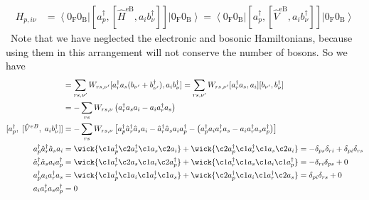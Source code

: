 \begin{align}
H_{p,i\nu} &= \left\langle 0_{\mathrm{F}} 0_{\mathrm{B}}\right|\left[a_p^\dag, \left[\hat{H}^{\mathrm{eB}}, a_i b_\nu^{\dagger} \right]\right]\left|0_{\mathrm{F}} 0_{\mathrm{B}}\right\rangle = \left\langle 0_{\mathrm{F}} 0_{\mathrm{B}}\right|\left[a_p^\dag, \left[\hat{V}^{\mathrm{eB}}, a_i b_\nu^{\dagger} \right]\right]\left|0_{\mathrm{F}} 0_{\mathrm{B}}\right\rangle
\end{align}\
Note that we have neglected the electronic and bosonic Hamiltonians, because using them in this arrangement will not conserve the number of bosons. So we have
\begin{align}
[ V^{eB},\; a_i b_\nu^\dagger ] &= \sum_{rs,\nu'} W_{rs, \nu'} [ a_r^{\dagger} a_s ( b_{\nu'} + b_{\nu'}^{\dagger} ), a_i b_\nu^\dagger ] = \sum_{rs,\nu'} W_{rs, \nu'} [ a_r^{\dagger} a_s, a_i ][ b_{\nu'}, b_\nu^\dagger ] \\
&= -\sum_{rs} W_{rs, \nu} \left( a_r^{\dagger} a_s a_i -  a_i a_r^{\dagger} a_s \right) \\
[a_p^\dagger,\;[\hat V^{eB},\;a_i b_\nu^\dagger]] &= -\sum_{rs} W_{rs, \nu} \left[ a_p^\dagger \hat{a}_r^{\dagger} \hat{a}_s a_i  - \hat{a}_r^{\dagger} \hat{a}_s a_i a_p^\dagger  - \left( a_p^\dag a_i a_r^{\dagger}a_s   - a_i a_r^{\dagger}a_s a_p^\dagger \right) \right] \\
a_p^\dagger \hat{a}_r^{\dagger} \hat{a}_s a_i  &= \wick{\c1 a_p^\dagger \c2 a_r^{\dagger} \c1 a_s \c2 a_i} + \wick{\c2 a_p^\dagger \c1 a_r^{\dagger} \c1 a_s \c2 a_i} = -\delta_{ps} \delta_{ri} + \delta_{pi} \delta_{rs} \\
\hat{a}_r^{\dagger} \hat{a}_s a_i a_p^\dagger &= \wick{\c1 a_r^{\dagger} \c2 a_s \c1 a_i \c2 a_p^\dagger} + \wick{\c1 a_r^{\dagger} \c1 a_s \c1 a_i \c1 a_p^\dagger} = -\delta_{ri} \delta_{ps} + 0 \\
a_p^\dag a_i a_r^{\dagger}a_s &= \wick{\c1 a_p^\dag \c1 a_i \c1 a_r^{\dagger} \c1 a_s} + \wick{\c2 a_p^\dag \c1 a_i \c1 a_r^{\dagger} \c2 a_s} = \delta_{pi} \delta_{rs} + 0 \\
a_i a_r^{\dagger}a_s a_p^\dagger &= 0 \\
\end{align}
